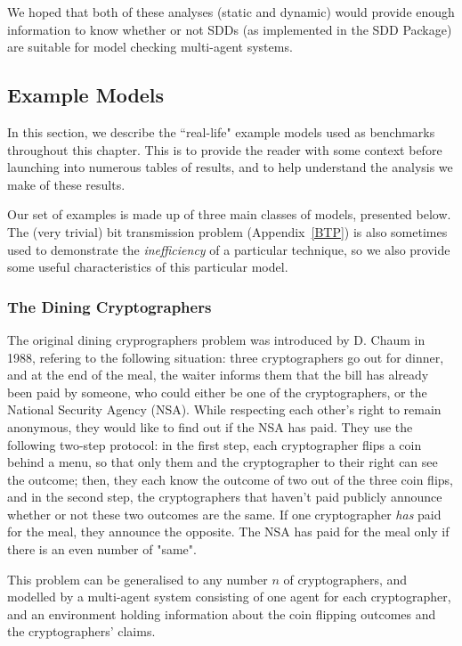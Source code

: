 \documentclass[11pt]{report}
\begin{document}
We hoped that both of these analyses (static and dynamic) would provide enough information to know whether or not SDDs (as implemented in the SDD Package) are suitable for model checking multi-agent systems.

\subsection{Example Models}
\label{ispl_examples}

In this section, we describe the ``real-life" example models used as benchmarks throughout this chapter. This is to provide the reader with some context before launching into numerous tables of results, and to help understand the analysis we make of these results. 

Our set of examples is made up of three main classes of models, presented below. The (very trivial) bit transmission problem (Appendix~\ref{BTP}) is also sometimes used to demonstrate the \textit{inefficiency} of a particular technique, so we also provide some useful characteristics of this particular model. 

\subsubsection{The Dining Cryptographers}

The original dining cryprographers problem was introduced by D. Chaum in 1988, refering to the following situation: three cryptographers go out for dinner, and at the end of the meal, the waiter informs them that the bill has already been paid by someone, who could either be one of the cryptographers, or the National Security Agency (NSA). While respecting each other's right to remain anonymous, they would like to find out if the NSA has paid. They use the following two-step protocol: in the first step, each cryptographer flips a coin behind a menu, so that only them and the cryptographer to their right can see the outcome; then, they each know the outcome of two out of the three coin flips, and in the second step, the cryptographers that haven't paid publicly announce whether or not these two outcomes are the same. If one cryptographer \textit{has} paid for the meal, they announce the opposite. The NSA has paid for the meal only if there is an even number of "same". 

This problem can be generalised to any number $n$ of cryptographers, and modelled by a multi-agent system consisting of one agent for each cryptographer, and an environment holding information about the coin flipping outcomes and the cryptographers' claims.
\end{document}
